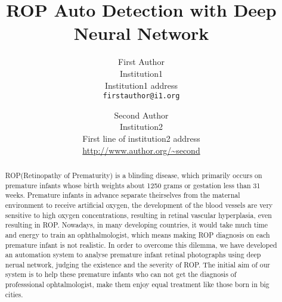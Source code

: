 \documentclass[10pt,twocolumn,letterpaper]{article}
\begin{document}
\title{ROP Auto Detection with Deep Neural Network}

\author{First Author\\
Institution1\\
Institution1 address\\
{\tt\small firstauthor@i1.org}
\and
Second Author\\
Institution2\\
First line of institution2 address\\
{\small\url{http://www.author.org/~second}}
}

\maketitle

\begin{abstract}
    ROP(Retinopathy of Prematurity) is a blinding disease, which primarily occurs on premature infants whose birth weights about 1250 grams or gestation less than 31 weeks.
    Premature infants in advance separate theirselves from the maternal environment to receive artificial oxygen, the development of the blood vessels are very sensitive to high oxygen concentrations, resulting in retinal vascular hyperplasia, even resulting in ROP.
    Nowadays, in many developing countries, it would take much time and energy to train an ophthalmologist, which means making ROP diagnosis on each premature infant is not realistic. In order to overcome this dilemma, we have developed an automation system to analyse premature infant retinal photographs using deep nerual network, judging the existence and the severity of ROP.
    The initial aim of our system is to help these premature infants who can not get the diagnosis of professsional ophtalmologist, make them enjoy equal treatment like those born in big cities.
\end{abstract}

\end{document}
